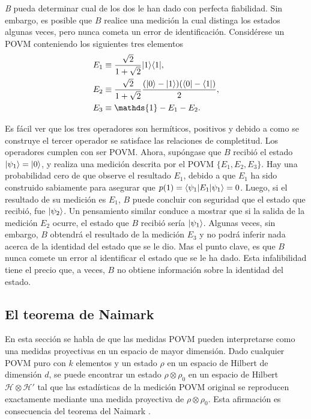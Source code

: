 \textit{B} pueda determinar cual de los dos le han dado con perfecta
fiabilidad. Sin embargo, es posible que $B$ realice una medición la cual
distinga los estados algunas veces, pero nunca cometa un error de
identificación. Considérese un POVM conteniendo los siguientes tres elementos 
	\begin{align}
		E_1 & \equiv \dfrac{\sqrt{2}}{1+\sqrt{2}} |1\rala1|, \label{eq11} \\
		E_2 & \equiv \dfrac{\sqrt{2}}{1+\sqrt{2}} \dfrac{(|0\ra -|1\ra)(\la0|-\la1|)}{2}, \label{eq12} \\
		E_3 & \equiv \mathds{1}-E_1-E_2\label{eq13}. 
	\end{align}

Es fácil ver que los tres operadores son hermíticos, positivos y debido a como
se construye el tercer operador se satisface las relaciones de completitud. Los
operadores cumplen con ser POVM\@. Ahora, supóngase que $B$ recibió el estado
$|\psi_1\rangle=|0\rangle$, y realiza una medición descrita por el POVM
$\{E_1,E_2,E_3\}$. Hay una probabilidad cero de que observe el resultado $E_1$,
debido a que $E_1$ ha sido construido sabiamente para asegurar que
$p(1)=\langle\psi_1|E_1|\psi_1\rangle=0$. Luego, si el resultado de su medición es
$E_1$, $B$ puede concluir con seguridad que el estado que recibió, fue
$|\psi_2\rangle $. Un pensamiento similar conduce a mostrar que si la salida de la
medición $E_2$ ocurre, el estado que $B$ recibió sería $|\psi_1\rangle$. Algunas
veces, sin embargo, $B$ obtendrá el resultado de la medición $E_3$ y no podrá
inferir nada acerca de la identidad del estado que se le dio. Mas el punto
clave, es que $B$ nunca comete un error al identificar el estado que se le ha
dado. Esta infalibilidad tiene el precio que, a veces, $B$ no obtiene
información sobre la identidad del estado.

\subsection{El teorema de Naimark} %
En esta sección se habla de que las medidas POVM pueden interpretarse como una medidas proyectivas en un espacio de mayor dimensión.  Dado cualquier POVM puro con $k$ elementos y un estado $\rho$ en un espacio de Hilbert de dimensión $d$, se puede encontrar un estado $\rho \otimes \rho_0$ en un espacio de Hilbert
$\mathcal{H}\otimes\mathcal{H'}$ tal que las estadísticas de la medición POVM
original se reproducen exactamente mediante una medida proyectiva de $\rho
\otimes \rho_0$. Esta afirmación es consecuencia del teorema del Naimark
{\cite{2007geometry}}.

